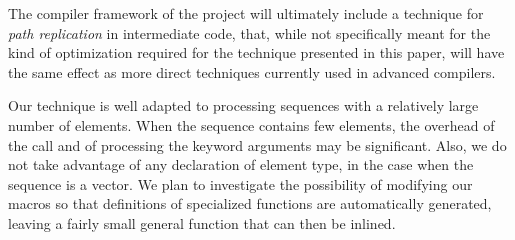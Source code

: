The \cleavir{} compiler framework of the \sicl{} project will
ultimately include a technique for \emph{path replication} in
intermediate code, that, while not specifically meant for the kind of
optimization required for the technique presented in this paper, will
have the same effect as more direct techniques currently used in
advanced compilers.

Our technique is well adapted to processing sequences with a
relatively large number of elements.  When the sequence contains few
elements, the overhead of the call and of processing the keyword
arguments may be significant.  Also, we do not take advantage of any
declaration of element type, in the case when the sequence is a
vector.  We plan to investigate the possibility of modifying our
macros so that definitions of specialized functions are automatically
generated, leaving a fairly small general function that can then be
inlined.

